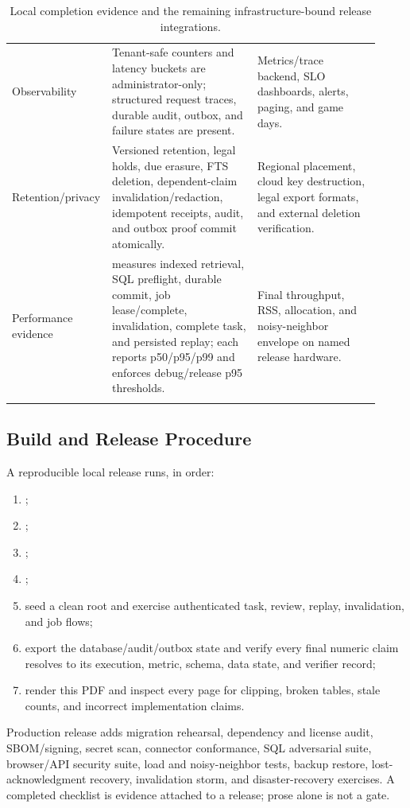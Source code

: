 \begin{longtable}{L{0.20\linewidth}L{0.39\linewidth}L{0.33\linewidth}}
Observability & Tenant-safe counters and latency buckets are administrator-only; structured request traces, durable audit, outbox, and failure states are present. & Metrics/trace backend, SLO dashboards, alerts, paging, and game days. \\
Retention/privacy & Versioned retention, legal holds, due erasure, FTS deletion, dependent-claim invalidation/redaction, idempotent receipts, audit, and outbox proof commit atomically. & Regional placement, cloud key destruction, legal export formats, and external deletion verification. \\
Performance evidence &  measures indexed retrieval, SQL preflight, durable commit, job lease/complete, invalidation, complete task, and persisted replay; each reports p50/p95/p99 and enforces debug/release p95 thresholds. & Final throughput, RSS, allocation, and noisy-neighbor envelope on named release hardware. \\
\bottomrule
\caption{Local completion evidence and the remaining infrastructure-bound release integrations.}
\end{longtable}

\subsection{Build and Release Procedure}

A reproducible local release runs, in order:
\begin{enumerate}
  \item {};
  \item {};
  \item {};
  \item {};
  \item seed a clean root and exercise authenticated task, review, replay, invalidation, and job flows;
  \item export the database/audit/outbox state and verify every final numeric claim resolves to its execution, metric, schema, data state, and verifier record;
  \item render this PDF and inspect every page for clipping, broken tables, stale counts, and incorrect implementation claims.
\end{enumerate}

Production release adds migration rehearsal, dependency and license audit, SBOM/signing, secret scan, connector conformance, SQL adversarial suite, browser/API security suite, load and noisy-neighbor tests, backup restore, lost-acknowledgment recovery, invalidation storm, and disaster-recovery exercises. A completed checklist is evidence attached to a release; prose alone is not a gate.

